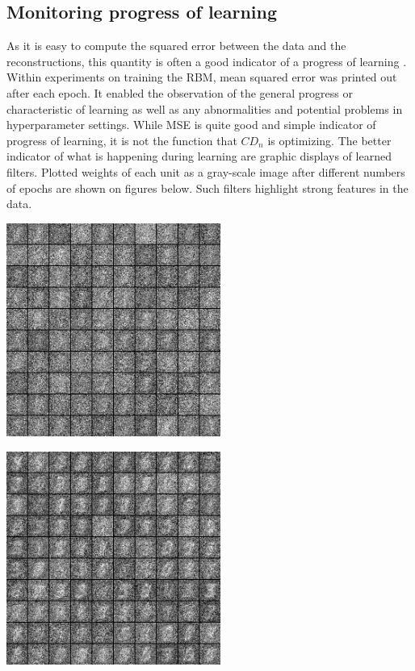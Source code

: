 \documentclass[a4paper]{scrartcl}
\begin{document}
\subsection{Monitoring progress of learning}
As it is easy to compute the squared error between the data and the reconstructions, this quantity is often a good indicator of a progress of learning \cite{Hinton}. Within experiments on training the RBM, mean squared error was printed out after each epoch. It enabled the observation of the general progress or characteristic of learning as well as any abnormalities and potential problems in hyperparameter settings. 
While MSE is quite good and simple indicator of progress of learning, it is not the function that $CD_n$ is optimizing. The better indicator of what is happening during learning are graphic displays of learned filters. Plotted weights of each unit as a gray-scale image after different numbers of epochs are shown on figures below. Such filters highlight strong features in the data.
\begin{minipage}[t]{0.5\textwidth}
\includegraphics[width=7cm]{images/filtry_1epoch_50train.png}
\end{minipage}
\begin{minipage}[t]{0.5\textwidth}
\includegraphics[width=7cm]{images/filtry_5epoch_50train.png}
\end{minipage}
\end{document}
